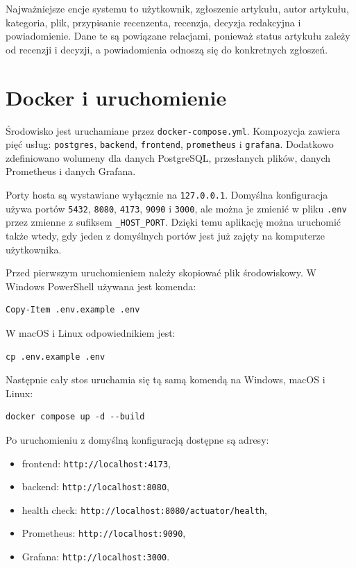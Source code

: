 \documentclass[times]{san}
\begin{document}
Najważniejsze encje systemu to użytkownik, zgłoszenie artykułu, autor artykułu, kategoria, plik, przypisanie recenzenta, recenzja, decyzja redakcyjna i powiadomienie. Dane te są powiązane relacjami, ponieważ status artykułu zależy od recenzji i decyzji, a powiadomienia odnoszą się do konkretnych zgłoszeń.

\section{Docker i uruchomienie}

Środowisko jest uruchamiane przez \texttt{docker-compose.yml}. Kompozycja zawiera pięć usług: \texttt{postgres}, \texttt{backend}, \texttt{frontend}, \texttt{prometheus} i \texttt{grafana}. Dodatkowo zdefiniowano wolumeny dla danych PostgreSQL, przesłanych plików, danych Prometheus i danych Grafana.

Porty hosta są wystawiane wyłącznie na \texttt{127.0.0.1}. Domyślna konfiguracja używa portów \texttt{5432}, \texttt{8080}, \texttt{4173}, \texttt{9090} i \texttt{3000}, ale można je zmienić w pliku \texttt{.env} przez zmienne z sufiksem \texttt{\_HOST\_PORT}. Dzięki temu aplikację można uruchomić także wtedy, gdy jeden z domyślnych portów jest już zajęty na komputerze użytkownika.

Przed pierwszym uruchomieniem należy skopiować plik środowiskowy. W Windows PowerShell używana jest komenda:

\begin{verbatim}
Copy-Item .env.example .env
\end{verbatim}

W macOS i Linux odpowiednikiem jest:

\begin{verbatim}
cp .env.example .env
\end{verbatim}

Następnie cały stos uruchamia się tą samą komendą na Windows, macOS i Linux:

\begin{verbatim}
docker compose up -d --build
\end{verbatim}

Po uruchomieniu z domyślną konfiguracją dostępne są adresy:

\begin{itemize}
    \item frontend: \texttt{http://localhost:4173},
    \item backend: \texttt{http://localhost:8080},
    \item health check: \texttt{http://localhost:8080/actuator/health},
    \item Prometheus: \texttt{http://localhost:9090},
    \item Grafana: \texttt{http://localhost:3000}.
\end{itemize}
\end{document}
